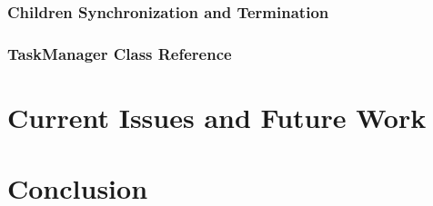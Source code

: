 \documentclass[11pt]{article}
\begin{document}
            
            \subsubsection{Children Synchronization and Termination}
        
            \subsubsection{TaskManager Class Reference}

    \section{Current Issues and Future Work}
    \section{Conclusion}
\end{document}
